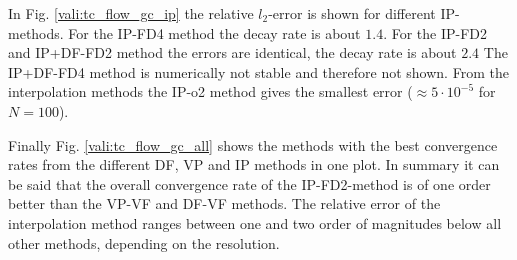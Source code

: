 In Fig. \ref{vali:tc_flow_gc_ip} the relative $l_2$-error is shown for different IP-methods.
For the IP-FD4 method the decay rate is about $1.4$.
For the IP-FD2 and IP+DF-FD2 method the errors are identical, the decay rate is about $2.4$
The IP+DF-FD4 method is numerically not stable and therefore not shown.
From the interpolation methods the IP-o2 method gives the smallest error  ($\approx 5 \cdot 10^{-5}$ for $N=100$).

Finally Fig. \ref{vali:tc_flow_gc_all} shows the methods  with the best convergence
rates from the different DF, VP and IP methods in one plot.
In summary it can be said that the overall convergence rate of the IP-FD2-method is of one order better
than the VP-VF and DF-VF methods. The relative error of the interpolation method ranges
between one and two order of magnitudes below all other methods, depending on the resolution.


